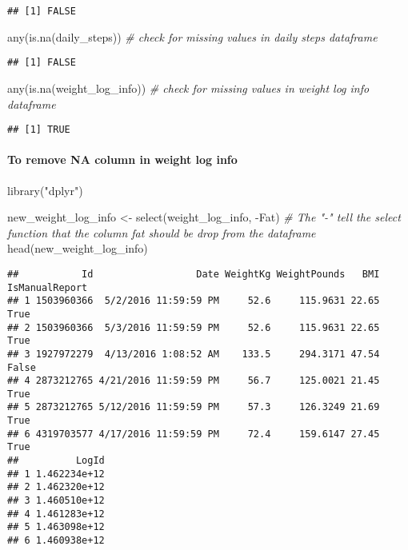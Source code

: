 \documentclass[
]{article}
\newenvironment{Shaded}{\begin{snugshade}}{\end{snugshade}}
\newcommand{\CommentTok}[1]{\textcolor[rgb]{0.56,0.35,0.01}{\textit{#1}}}
\newcommand{\FunctionTok}[1]{\textcolor[rgb]{0.00,0.00,0.00}{#1}}
\newcommand{\NormalTok}[1]{#1}
\newcommand{\OtherTok}[1]{\textcolor[rgb]{0.56,0.35,0.01}{#1}}
\newcommand{\SpecialCharTok}[1]{\textcolor[rgb]{0.00,0.00,0.00}{#1}}
\newcommand{\StringTok}[1]{\textcolor[rgb]{0.31,0.60,0.02}{#1}}
\begin{document}
\begin{verbatim}
## [1] FALSE
\end{verbatim}

\begin{Shaded}
\begin{Highlighting}[]
\FunctionTok{any}\NormalTok{(}\FunctionTok{is.na}\NormalTok{(daily\_steps)) }\CommentTok{\# check for missing values in daily steps dataframe}
\end{Highlighting}
\end{Shaded}

\begin{verbatim}
## [1] FALSE
\end{verbatim}

\begin{Shaded}
\begin{Highlighting}[]
\FunctionTok{any}\NormalTok{(}\FunctionTok{is.na}\NormalTok{(weight\_log\_info)) }\CommentTok{\# check for missing values in weight log info dataframe}
\end{Highlighting}
\end{Shaded}

\begin{verbatim}
## [1] TRUE
\end{verbatim}

\hypertarget{to-remove-na-column-in-weight-log-info}{%
\paragraph{To remove NA column in weight log
info}\label{to-remove-na-column-in-weight-log-info}}

\begin{Shaded}
\begin{Highlighting}[]
\FunctionTok{library}\NormalTok{(}\StringTok{"dplyr"}\NormalTok{)   }

\NormalTok{new\_weight\_log\_info }\OtherTok{\textless{}{-}} \FunctionTok{select}\NormalTok{(weight\_log\_info, }\SpecialCharTok{{-}}\NormalTok{Fat) }\CommentTok{\# The "{-}" tell the select function that the column fat should be drop from the dataframe}
\FunctionTok{head}\NormalTok{(new\_weight\_log\_info)}
\end{Highlighting}
\end{Shaded}

\begin{verbatim}
##           Id                  Date WeightKg WeightPounds   BMI IsManualReport
## 1 1503960366  5/2/2016 11:59:59 PM     52.6     115.9631 22.65           True
## 2 1503960366  5/3/2016 11:59:59 PM     52.6     115.9631 22.65           True
## 3 1927972279  4/13/2016 1:08:52 AM    133.5     294.3171 47.54          False
## 4 2873212765 4/21/2016 11:59:59 PM     56.7     125.0021 21.45           True
## 5 2873212765 5/12/2016 11:59:59 PM     57.3     126.3249 21.69           True
## 6 4319703577 4/17/2016 11:59:59 PM     72.4     159.6147 27.45           True
##          LogId
## 1 1.462234e+12
## 2 1.462320e+12
## 3 1.460510e+12
## 4 1.461283e+12
## 5 1.463098e+12
## 6 1.460938e+12
\end{verbatim}
\end{document}
